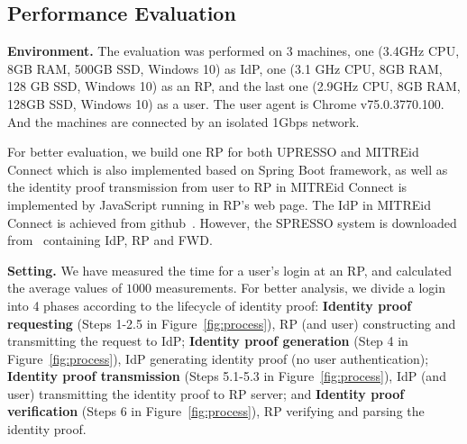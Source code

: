 \subsection{Performance Evaluation}
\label{sec:evaluation}
\noindent\textbf{Environment.} The evaluation was performed on 3 machines, one (3.4GHz CPU, 8GB RAM, 500GB SSD, Windows 10) as IdP, one (3.1 GHz CPU, 8GB RAM, 128 GB SSD, Windows 10) as an RP, and the last one (2.9GHz CPU, 8GB RAM, 128GB SSD, Windows 10) as a user. The user agent is Chrome v75.0.3770.100. And the machines are connected by an isolated 1Gbps network.

For better evaluation, we build one RP for both UPRESSO and MITREid Connect which is also implemented  based on Spring Boot framework, as well as the identity proof transmission from user to RP in MITREid Connect is implemented by JavaScript running in RP's web page. The IdP in MITREid Connect is achieved from github~\cite{MITREid}. However, the SPRESSO system is downloaded from~\cite{spressome} containing IdP, RP and FWD. 


\noindent\textbf{Setting.} We have measured the time for a user's login at an RP, and calculated the average values of $1000$ measurements.
For better analysis, we divide a login into 4 phases according to the lifecycle of identity proof: \textbf{Identity proof requesting} (Steps 1-2.5 in Figure~\ref{fig:process}), RP (and user) constructing and transmitting the request to IdP; \textbf{Identity proof generation} (Step 4 in Figure~\ref{fig:process}), IdP generating identity proof (no user authentication); \textbf{Identity proof transmission} (Steps 5.1-5.3 in Figure~\ref{fig:process}), IdP (and user) transmitting the identity proof to RP server; and \textbf{Identity proof verification} (Steps 6 in Figure~\ref{fig:process}), RP verifying and parsing the identity proof.

